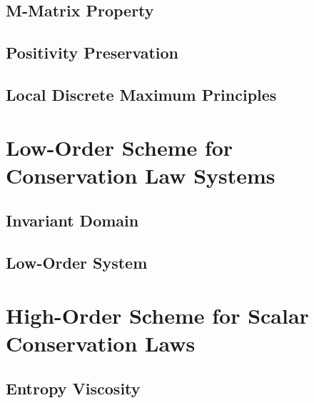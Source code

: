 \subsection{M-Matrix Property\label{sec:m_matrix}}
  
\subsection{Positivity Preservation\label{sec:positivity_preservation}}
  
\subsection{Local Discrete Maximum Principles\label{sec:DMP}}
  
  
  
  
\section{Low-Order Scheme for Conservation Law Systems}\label{sec:low_order_system}

\subsection{Invariant Domain\label{sec:invariant_domain}}
  
\subsection{Low-Order System\label{sec:low_order_scheme_system}}
  
\section{High-Order Scheme for Scalar Conservation Laws
  \label{sec:high_order_scalar}}  

\subsection{Entropy Viscosity\label{sec:entropy_viscosity_scalar}}
    
